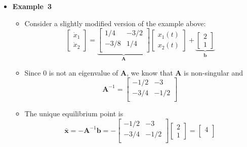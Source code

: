 \documentclass[12pt,a4paper]{article}
\begin{document}
\begin{itemize}
\item \textbf{Example~3}
  \begin{itemize}
  \item Consider a slightly modified version of the example above:
    \begin{equation}\nonumber%
      \begin{bmatrix}
        \dot{x}_{1} \\
        \dot{x}_{2}
      \end{bmatrix}
      =
      \underbrace{
      \begin{bmatrix}
        1/4 & -3/2 \\
        -3/8 & 1/4 \\
      \end{bmatrix}}_{\bm{A}}
      \begin{bmatrix}
        x_{1}(t) \\
        x_{2}(t)
      \end{bmatrix}
      +
      \underbrace{
      \begin{bmatrix}
        2 \\
        1
      \end{bmatrix}}_{\bm{b}}
    \end{equation}
  \item Since $0$ is not an eigenvalue of $\bm{A}$,
    we know that $\bm{A}$ is non-singular and
    \begin{equation}\nonumber%
      \bm{A}^{-1}
      = 
      \begin{bmatrix}
        -1/2 & -3 \\
        -3/4 & -1/2 \\
      \end{bmatrix}
    \end{equation}
  \item The unique equilibrium point is
    \begin{equation}\nonumber%
      \bar{\bm{x}} =
      -\bm{A}^{-1}\bm{b} =
      -
      \begin{bmatrix}
        -1/2 & -3 \\
        -3/4 & -1/2 \\
      \end{bmatrix}
      \begin{bmatrix}
        2 \\
        1
      \end{bmatrix}
      =
      \begin{bmatrix}
        4 \\

\end{bmatrix}
\end{equation}
\end{itemize}
\end{itemize}
\end{document}
